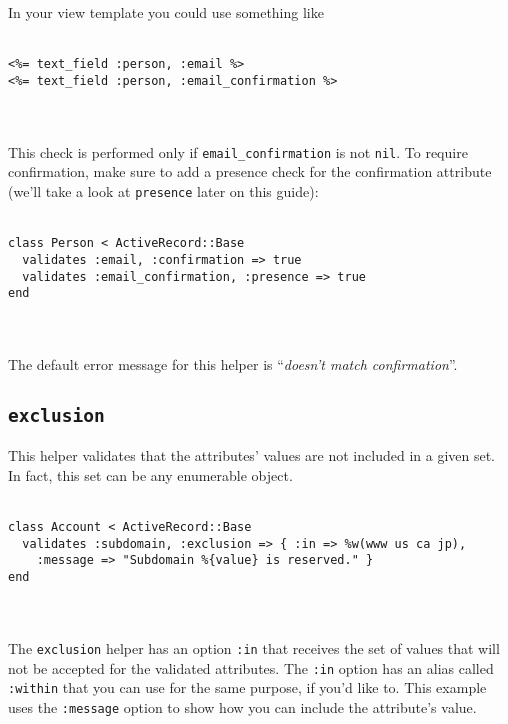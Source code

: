 \documentclass[10pt]{book}
\begin{document}
In your view template you could use something like
\\ \\
\begin{minipage}{\textwidth}{\scriptsize
\begin{verbatim}
<%= text_field :person, :email %>
<%= text_field :person, :email_confirmation %>
\end{verbatim}}
\end{minipage}
\\ \\

This check is performed only if \texttt{email\_confirmation} is not \texttt{nil}. To require confirmation, make sure to add a presence check for the confirmation attribute (we’ll take a look at \texttt{presence} later on this guide):
\\ \\
\begin{minipage}{\textwidth}{\scriptsize
\begin{verbatim}
class Person < ActiveRecord::Base
  validates :email, :confirmation => true
  validates :email_confirmation, :presence => true
end
\end{verbatim}}
\end{minipage}
\\ \\

The default error message for this helper is “\emph{doesn’t match confirmation}”.

\subsection{ \texttt{exclusion}}

This helper validates that the attributes’ values are not included in  a given set. In fact, this set can be any enumerable object.
\\ \\
\begin{minipage}{\textwidth}{\scriptsize
\begin{verbatim}
class Account < ActiveRecord::Base
  validates :subdomain, :exclusion => { :in => %w(www us ca jp),
    :message => "Subdomain %{value} is reserved." }
end
\end{verbatim}}
\end{minipage}
\\ \\

The \texttt{exclusion} helper has an option \texttt{:in} that receives the set of values that will not be accepted for the validated attributes. The \texttt{:in} option has an alias called \texttt{:within} that you can use for the same purpose, if you’d like to. This example uses the \texttt{:message} option to show how you can include the attribute’s value.
\end{document}

